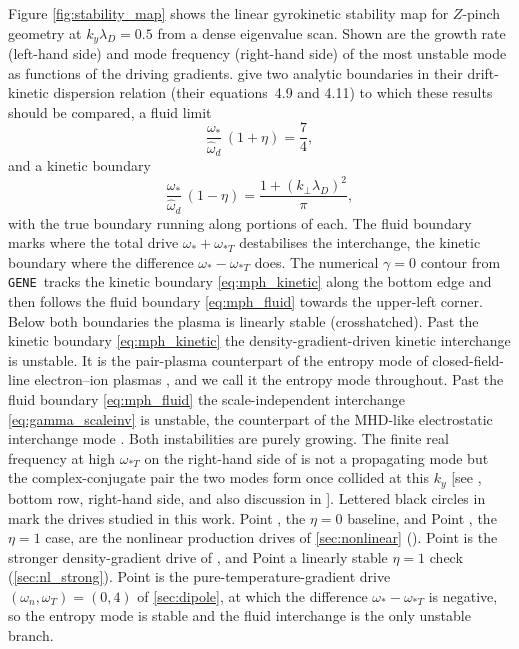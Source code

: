 \documentclass{jpp}
\newcommand{\kperp}{k_\perp}
\newcommand{\lambdaD}{\lambda_D}
\newcommand{\omstar}{\omega_*}
\newcommand{\gene}{\texttt{GENE}}
\newcommand{\circled}[1]{\tikz[baseline=(char.base)]{\node[shape=circle,draw,inner sep=1.2pt,line width=0.4pt] (char) {\footnotesize #1};}}
\begin{document}
Figure \ref{fig:stability_map} shows the linear gyrokinetic stability map for $Z$-pinch geometry at $k_y\lambda_D = 0.5$ from a dense eigenvalue scan. Shown are the growth rate (left-hand side) and mode frequency (right-hand side) of the most unstable mode as functions of the driving gradients. \citet{MPH2018} give two analytic boundaries in their drift-kinetic dispersion relation (their equations~4.9 and 4.11) to which these results should be compared, a fluid limit
\begin{equation}\label{eq:mph_fluid}
  \frac{\omstar}{\hat\omega_d}\,(1 + \eta) = \frac{7}{4},
\end{equation}
and a kinetic boundary
\begin{equation}\label{eq:mph_kinetic}
  \frac{\omstar}{\hat\omega_d}\,(1 - \eta) = \frac{1 + (\kperp \lambdaD)^2}{\pi},
\end{equation}
with the true boundary running along portions of each. The fluid boundary marks where the total drive $\omega_*+\omega_{*T}$ destabilises the interchange, the kinetic boundary where the difference $\omega_*-\omega_{*T}$ does. The numerical $\gamma = 0$ contour from \gene\ tracks the kinetic boundary \cref{eq:mph_kinetic} along the bottom edge and then follows the fluid boundary \cref{eq:mph_fluid} towards the upper-left corner. Below both boundaries the plasma is linearly stable (crosshatched). Past the kinetic boundary \cref{eq:mph_kinetic} the density-gradient-driven kinetic interchange is unstable. It is the pair-plasma counterpart of the entropy mode of closed-field-line electron--ion plasmas \citep{Simakov2001, Ricci2006}, and we call it the entropy mode throughout. Past the fluid boundary \cref{eq:mph_fluid} the scale-independent interchange \cref{eq:gamma_scaleinv} is unstable, the counterpart of the MHD-like electrostatic interchange mode \citep{Kesner2001, Simakov2001}. Both instabilities are purely growing. The finite real frequency at high $\omega_{*T}$ on the right-hand side of  is not a propagating mode but the complex-conjugate pair the two modes form once collided at this $k_y$ [see , bottom row, right-hand side, and also discussion in \citet{Kennedy2018,Kennedy2020}]. Lettered black circles in  mark the drives studied in this work. Point \circled{A}, the $\eta = 0$ baseline, and Point \circled{B}, the $\eta = 1$ case, are the nonlinear production drives of \cref{sec:nonlinear} (). Point \circled{C} is the stronger density-gradient drive of , and Point \circled{D} a linearly stable $\eta = 1$ check (\cref{sec:nl_strong}). Point \circled{E} is the pure-temperature-gradient drive $(\omega_n, \omega_T) = (0, 4)$ of \cref{sec:dipole}, at which the difference $\omega_* - \omega_{*T}$ is negative, so the entropy mode is stable and the fluid interchange is the only unstable branch.
\end{document}
